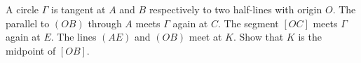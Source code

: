 A circle $\Gamma$ is tangent at $A$ and $B$ respectively to two half-lines with origin $O$. The parallel to $(OB)$ through $A$ meets $\Gamma$ again at $C$. The segment $[OC]$ meets $\Gamma$ again at $E$. The lines $(AE)$ and $(OB)$ meet at $K$. Show that $K$ is the midpoint of $[OB]$.
